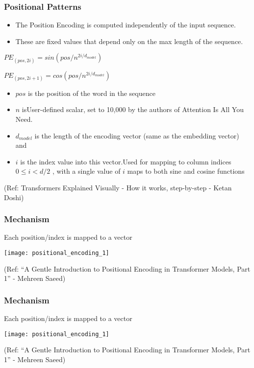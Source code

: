 \begin{frame}[fragile]\frametitle{Positional Patterns}

\begin{itemize}
\item The Position Encoding is computed independently of the input sequence. 
\item These are fixed values that depend only on the max length of the sequence. 
\end{itemize}

$PE_{(pos,2i)} = sin(pos/n^{2i/d_{model}})$


$PE_{(pos,2i+1)} = cos(pos/n^{2i/d_{model}})$

\begin{itemize}
\item $pos$ is the position of the word in the sequence
\item $n$ isUser-defined scalar, set to 10,000 by the authors of Attention Is All You Need.
\item $d_{model}$ is the length of the encoding vector (same as the embedding vector) and
\item $i$ is the index value into this vector.Used for mapping to column indices $0 \leq i < d/2$ , with a single value of $i$
 maps to both sine and cosine functions
\end{itemize}

{\tiny (Ref: Transformers Explained Visually - How it works, step-by-step - Ketan Doshi)}

\end{frame}

\begin{frame}[fragile]\frametitle{Mechanism}

Each position/index is mapped to a vector

\begin{center}
\texttt{[image: positional\_encoding\_1]}


{\tiny (Ref: ``A Gentle Introduction to Positional Encoding in Transformer Models, Part 1'' - Mehreen Saeed)}
\end{center}		

\end{frame}


\begin{frame}[fragile]\frametitle{Mechanism}

Each position/index is mapped to a vector

\begin{center}
\texttt{[image: positional\_encoding\_1]}


{\tiny (Ref: ``A Gentle Introduction to Positional Encoding in Transformer Models, Part 1'' - Mehreen Saeed)}
\end{center}		

\end{frame}

